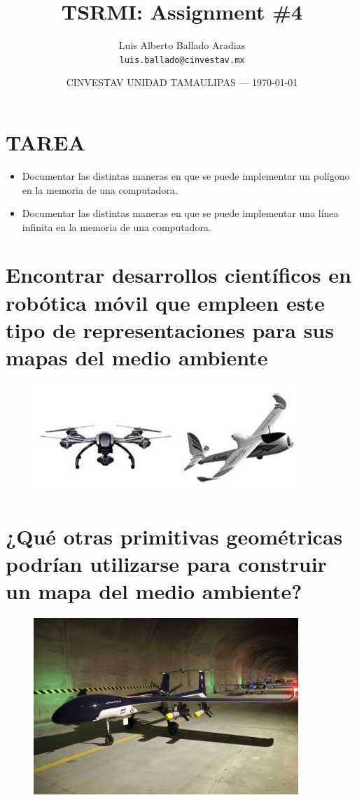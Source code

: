\documentclass{article}
\title{TSRMI: Assignment \#4} %
\author{Luis Alberto Ballado Aradias\\ \texttt{luis.ballado@cinvestav.mx}} %
\date{CINVESTAV UNIDAD TAMAULIPAS --- \today} %
\begin{document}
\maketitle %


\section*{TAREA} %

\begin{itemize}
\item Documentar las distintas maneras en que se puede implementar un polígono en la memoria de una computadora.
\item Documentar las distintas maneras en que se puede implementar una línea infinita en la memoria de una computadora.
\end{itemize}

\newpage
\section{Encontrar desarrollos científicos en robótica móvil que empleen este tipo de representaciones para sus mapas del medio ambiente} %


\begin{figure}[h]
\includegraphics[width=10cm]{images/vant.jpg}
\centering
\end{figure}

\newpage
\section{¿Qué otras primitivas geométricas podrían utilizarse para construir un mapa del medio ambiente?}

\begin{figure}[h]
\includegraphics[width=10cm]{images/drone_alafija.jpg}
\centering
\end{figure}
\end{document}
